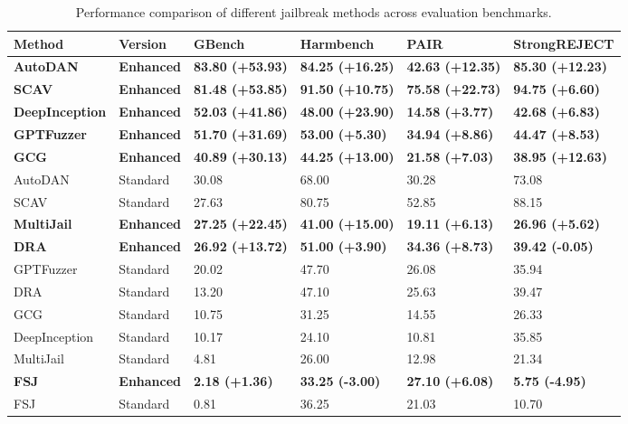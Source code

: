 \begin{table*}[h]
\caption{Performance comparison of different jailbreak methods across evaluation benchmarks.}
\label{tab:evaluation-leaderboard-enhanced}
\begin{threeparttable}
\footnotesize
\renewcommand{\arraystretch}{1.2}
\setlength{\tabcolsep}{0.9\tabcolsep}
\setlength{\defaultaddspace}{0.7\defaultaddspace} %
\centering
\begin{tabular}{l l llll}
\toprule
\textbf{Method} & \textbf{Version} & \textbf{GBench} & \textbf{Harmbench} & \textbf{PAIR} & \textbf{StrongREJECT} \\
\midrule
\textbf{AutoDAN} & \textbf{Enhanced} & \textbf{83.80 (+53.93)} & \textbf{84.25 (+16.25)} & \textbf{42.63 (+12.35)} & \textbf{85.30 (+12.23)} \\
\textbf{SCAV} & \textbf{Enhanced} & \textbf{81.48 (+53.85)} & \textbf{91.50 (+10.75)} & \textbf{75.58 (+22.73)} & \textbf{94.75 (+6.60)} \\
\textbf{DeepInception} & \textbf{Enhanced} & \textbf{52.03 (+41.86)} & \textbf{48.00 (+23.90)} & \textbf{14.58 (+3.77)} & \textbf{42.68 (+6.83)} \\
\textbf{GPTFuzzer} & \textbf{Enhanced} & \textbf{51.70 (+31.69)} & \textbf{53.00 (+5.30)} & \textbf{34.94 (+8.86)} & \textbf{44.47 (+8.53)} \\
\textbf{GCG} & \textbf{Enhanced} & \textbf{40.89 (+30.13)} & \textbf{44.25 (+13.00)} & \textbf{21.58 (+7.03)} & \textbf{38.95 (+12.63)} \\
AutoDAN & Standard & 30.08 & 68.00 & 30.28 & 73.08 \\
SCAV & Standard & 27.63 & 80.75 & 52.85 & 88.15 \\
\textbf{MultiJail} & \textbf{Enhanced} & \textbf{27.25 (+22.45)} & \textbf{41.00 (+15.00)} & \textbf{19.11 (+6.13)} & \textbf{26.96 (+5.62)} \\
\textbf{DRA} & \textbf{Enhanced} & \textbf{26.92 (+13.72)} & \textbf{51.00 (+3.90)} & \textbf{34.36 (+8.73)} & \textbf{39.42 (-0.05)} \\
GPTFuzzer & Standard & 20.02 & 47.70 & 26.08 & 35.94 \\
DRA & Standard & 13.20 & 47.10 & 25.63 & 39.47 \\
GCG & Standard & 10.75 & 31.25 & 14.55 & 26.33 \\
DeepInception & Standard & 10.17 & 24.10 & 10.81 & 35.85 \\
MultiJail & Standard & 4.81 & 26.00 & 12.98 & 21.34 \\
\textbf{FSJ} & \textbf{Enhanced} & \textbf{2.18 (+1.36)} & \textbf{33.25 (-3.00)} & \textbf{27.10 (+6.08)} & \textbf{5.75 (-4.95)} \\
FSJ & Standard & 0.81 & 36.25 & 21.03 & 10.70 \\
\bottomrule
\end{tabular}
\begin{tablenotes}
%
\end{tablenotes}
\end{threeparttable}%
\end{table*}
